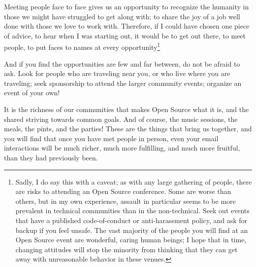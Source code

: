 Meeting people face to face gives us an opportunity to recognize the
humanity in those we might have struggled to get along with; to share
the joy of a job well done with those we love to work with. Therefore,
if I could have chosen one piece of advice, to hear when I was
starting out, it would be to get out there, to meet people, to put
faces to names at every opportunity\footnote{Sadly, I do say this with a caveat;
as with any large gathering of
people, there are risks to attending an Open Source conference. Some
are worse than others, but in my own experience, assault in particular
seems to be more prevalent in technical communities than in the
non-technical. Seek out events that have a published code-of-conduct
or anti-harassment policy, and ask for backup if you feel unsafe. The
vast majority of the people you will find at an Open Source event are
wonderful, caring human beings; I hope that in time, changing
attitudes will stop the minority from thinking that they can get away
with unreasonable behavior in these venues.}

And if you find the opportunities are few and far between, do not be
afraid to ask. Look for people who are traveling near you, or who
live where you are traveling; seek sponsorship to attend the larger
community events; organize an event of your own!

It is the richness of our communities that makes Open Source what it
is, and the shared striving towards common goals. And of course, the
music sessions, the meals, the pints, and the parties! These are the
things that bring us together, and you will find that once you have met
people in person, even your email interactions will be much richer,
much more fulfilling, and much more fruitful, than they had previously
been.
